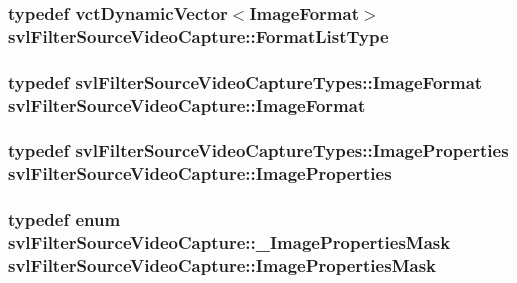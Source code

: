 \subsubsection[{Format\+List\+Type}]{\setlength{\rightskip}{0pt plus 5cm}typedef {\bf vct\+Dynamic\+Vector}$<${\bf Image\+Format}$>$ {\bf svl\+Filter\+Source\+Video\+Capture\+::\+Format\+List\+Type}}\label{classsvl_filter_source_video_capture_af6d31bdf8807755322cd7e5ef1f0d8d9}
\hypertarget{classsvl_filter_source_video_capture_a0944cc8abe4240701683128c28fa5349}{}
\subsubsection[{Image\+Format}]{\setlength{\rightskip}{0pt plus 5cm}typedef {\bf svl\+Filter\+Source\+Video\+Capture\+Types\+::\+Image\+Format} {\bf svl\+Filter\+Source\+Video\+Capture\+::\+Image\+Format}}\label{classsvl_filter_source_video_capture_a0944cc8abe4240701683128c28fa5349}
\hypertarget{classsvl_filter_source_video_capture_ad5d8ccc6a284be386d49b60574937f4d}{}
\subsubsection[{Image\+Properties}]{\setlength{\rightskip}{0pt plus 5cm}typedef {\bf svl\+Filter\+Source\+Video\+Capture\+Types\+::\+Image\+Properties} {\bf svl\+Filter\+Source\+Video\+Capture\+::\+Image\+Properties}}\label{classsvl_filter_source_video_capture_ad5d8ccc6a284be386d49b60574937f4d}
\hypertarget{classsvl_filter_source_video_capture_a52391ed8950c7d9b76ddb7d444a18ed1}{}
\subsubsection[{Image\+Properties\+Mask}]{\setlength{\rightskip}{0pt plus 5cm}typedef enum {\bf svl\+Filter\+Source\+Video\+Capture\+::\+\_\+\+Image\+Properties\+Mask}  {\bf svl\+Filter\+Source\+Video\+Capture\+::\+Image\+Properties\+Mask}}\label{classsvl_filter_source_video_capture_a52391ed8950c7d9b76ddb7d444a18ed1}
\hypertarget{classsvl_filter_source_video_capture_a374a69b1d506cf982ba5ce45d5f84776}{}
